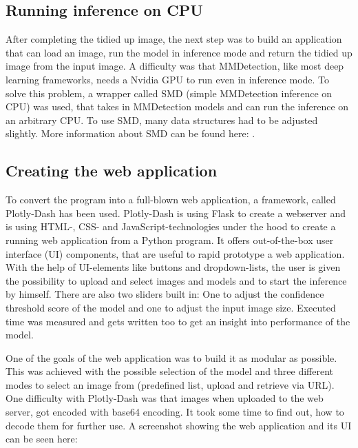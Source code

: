 \subsection{Running inference on CPU}
\label{inference-cpu}

After completing the tidied up image, the next step was to build an application that can load an image, run the model in inference mode and return the tidied up image from the input image. A difficulty was that MMDetection, like most deep learning frameworks, needs a Nvidia GPU to run even in inference mode. To solve this problem, a wrapper called SMD (simple MMDetection inference on CPU) was used, that takes in MMDetection models and can run the inference on an arbitrary CPU. To use SMD, many data structures had to be adjusted slightly. More information about SMD can be found here:  \cite{SMD}.

\subsection{Creating the web application}

To convert the program into a full-blown web application, a framework, called Plotly-Dash has been used. Plotly-Dash is using Flask to create a webserver and is using HTML-, CSS- and JavaScript-technologies under the hood to create a running web application from a Python program. It offers out-of-the-box user interface (UI) components, that are useful to rapid prototype a web application. With the help of UI-elements like buttons and dropdown-lists, the user is given the possibility to upload and select images and models and to start the inference by himself. There are also two sliders built in: One to adjust the confidence threshold score of the model and one to adjust the input image size. Executed time was measured and gets written too to get an insight into performance of the model.

One of the goals of the web application was to build it as modular as possible. This was achieved with the possible selection of the model and three different modes to select an image from (predefined list, upload and retrieve via URL). One difficulty with Plotly-Dash was that images when uploaded to the web server, got encoded with base64 encoding. It took some time to find out, how to decode them for further use. A screenshot showing the web application and its UI can be seen here:

